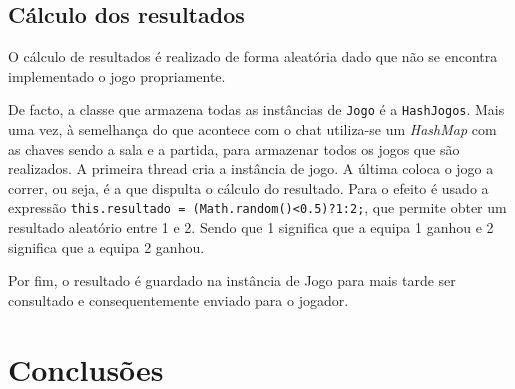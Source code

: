 \documentclass[a4paper]{article}
\begin{document}

\subsection{Cálculo dos resultados}
\label{sec:3.5}
\hspace{3mm} O cálculo de resultados é realizado de forma aleatória dado que não se encontra implementado o jogo propriamente.

De facto, a classe que armazena todas as instâncias de \texttt{Jogo} é a \texttt{HashJogos}. Mais uma vez, à semelhança do que acontece com o chat utiliza-se um \textit{HashMap} com as chaves sendo a sala e a partida, para armazenar todos os jogos que são realizados. A primeira thread cria a instância de jogo. A última coloca o jogo a correr, ou seja, é a que dispulta o cálculo do resultado. Para o efeito é usado a expressão \texttt{this.resultado = (Math.random()<0.5)?1:2;}, que permite obter um resultado aleatório entre 1 e 2. Sendo que 1 significa que a equipa 1 ganhou e 2 significa que a equipa 2 ganhou. 

Por fim, o resultado é guardado na instância de Jogo para mais tarde ser consultado e consequentemente enviado para o jogador.


\section{Conclusões}
\label{sec:4}

\hspace{3mm} 
\end{document}
